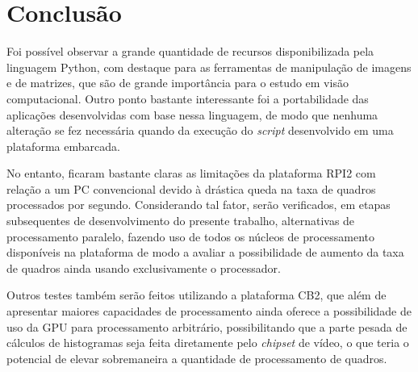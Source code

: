 \documentclass[conference]{IEEEtran}
\begin{document}




\section{Conclusão}
Foi possível observar a grande quantidade de recursos disponibilizada pela linguagem Python, com destaque para as ferramentas de manipulação de imagens e de matrizes, que são de grande importância para o estudo em visão computacional. Outro ponto bastante interessante foi a portabilidade das aplicações desenvolvidas com base nessa linguagem, de modo que nenhuma alteração se fez necessária quando da execução do \textit{script} desenvolvido em uma plataforma embarcada.

No entanto, ficaram bastante claras as limitações da plataforma RPI2 com relação a um PC convencional devido à drástica queda na taxa de quadros processados por segundo. Considerando tal fator, serão verificados, em etapas subsequentes de desenvolvimento do presente trabalho, alternativas de processamento paralelo, fazendo uso de todos os núcleos de processamento disponíveis na plataforma de modo a avaliar a possibilidade de aumento da taxa de quadros ainda usando exclusivamente o processador.

Outros testes também serão feitos utilizando a plataforma CB2, que além de apresentar maiores capacidades de processamento ainda oferece a possibilidade de uso da GPU para processamento arbitrário, possibilitando que a parte pesada de cálculos de histogramas seja feita diretamente pelo \textit{chipset} de vídeo, o que teria o potencial de elevar sobremaneira a quantidade de processamento de quadros.






\end{document}
